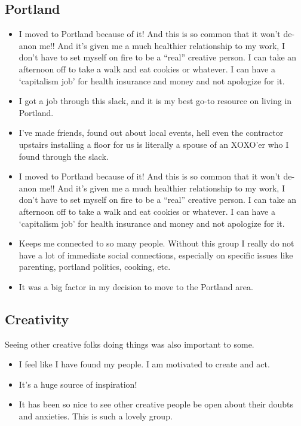 \documentclass[
]{book}
\providecommand{\tightlist}{%
  \setlength{\itemsep}{0pt}\setlength{\parskip}{0pt}}
\begin{document}
\subsection{Portland}\label{portland-1}

\begin{itemize}
\tightlist
\item
  I moved to Portland because of it! And this is so common that it won't de-anon me!! And it's given me a much healthier relationship to my work, I don't have to set myself on fire to be a ``real'' creative person. I can take an afternoon off to take a walk and eat cookies or whatever. I can have a `capitalism job' for health insurance and money and not apologize for it.
\item
  I got a job through this slack, and it is my best go-to resource on living in Portland.
\item
  I've made friends, found out about local events, hell even the contractor upstairs installing a floor for us is literally a spouse of an XOXO'er who I found through the slack.
\item
  I moved to Portland because of it! And this is so common that it won't de-anon me!! And it's given me a much healthier relationship to my work, I don't have to set myself on fire to be a ``real'' creative person. I can take an afternoon off to take a walk and eat cookies or whatever. I can have a `capitalism job' for health insurance and money and not apologize for it.
\item
  Keeps me connected to so many people. Without this group I really do not have a lot of immediate social connections, especially on specific issues like parenting, portland politics, cooking, etc.
\item
  It was a big factor in my decision to move to the Portland area.
\end{itemize}

\subsection{Creativity}\label{creativity-1}

Seeing other creative folks doing things was also important to some.

\begin{itemize}
\tightlist
\item
  I feel like I have found my people. I am motivated to create and act.
\item
  It's a huge source of inspiration!
\item
  It has been so nice to see other creative people be open about their doubts and anxieties. This is such a lovely group.
\end{itemize}
\end{document}
